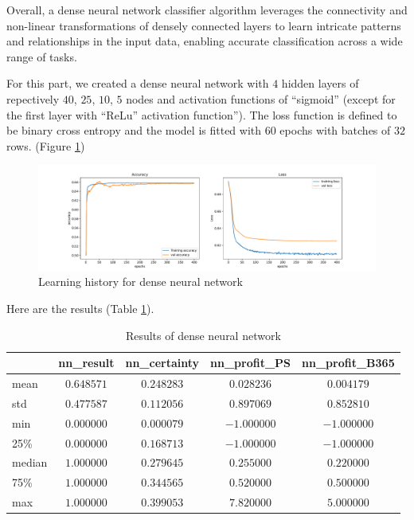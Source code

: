 \documentclass[preprint,aps,nofootinbib,a4paper,superscriptaddress,longbibliography,amsfonts,amssymb,amsmath,titlepage]{revtex4-2}
\begin{document}
Overall, a dense neural network classifier algorithm leverages the connectivity and non-linear transformations of densely connected layers to learn intricate patterns and relationships in the input data, enabling accurate classification across a wide range of tasks.

For this part, we created a dense neural network with $4$ hidden layers of repectively $40$, $25$, $10$, $5$ nodes and activation functions of ``sigmoid'' (except for the first layer with ``ReLu'' activation function''). The loss function is defined to be binary cross entropy and the model is fitted with $60$ epochs with batches of $32$ rows. (Figure \ref{nn-history})
%
\begin{figure}[h]
\includegraphics[width=\textwidth]{pictures/nn-history.pdf}
\caption{Learning history for dense neural network}
\label{nn-history}
\end{figure}
%

Here are the results (Table \ref{nn-result}).
%
\begin{table}[h]
\centering
\caption{Results of dense neural network}
\begin{tabular}{|l|c|c|c|c|}
\hline
& \textbf{nn\_result} & \textbf{nn\_certainty} & \textbf{nn\_profit\_PS}& \textbf{nn\_profit\_B365} \\
\hline
mean & $0.648571$ & $0.248283$ & $0.028236$ & $0.004179$ \\
\hline
std & $0.477587$ & $0.112056$ & $0.897069$ & $0.852810$ \\
\hline
min & $0.000000$ & $0.000079$ & $-1.000000$ & $-1.000000$ \\
\hline
25\% & $0.000000$ & $0.168713$ & $-1.000000$ & $-1.000000$ \\
\hline
median & $1.000000$ & $0.279645$ & $0.255000$ & $0.220000$ \\
\hline
75\% & $1.000000$ & $0.344565$ & $0.520000$ & $0.500000$ \\
\hline
max & $1.000000$ & $0.399053$ & $7.820000$ & $5.000000$ \\
\hline
\end{tabular}

\label{nn-result}
\end{table}
%
\end{document}

